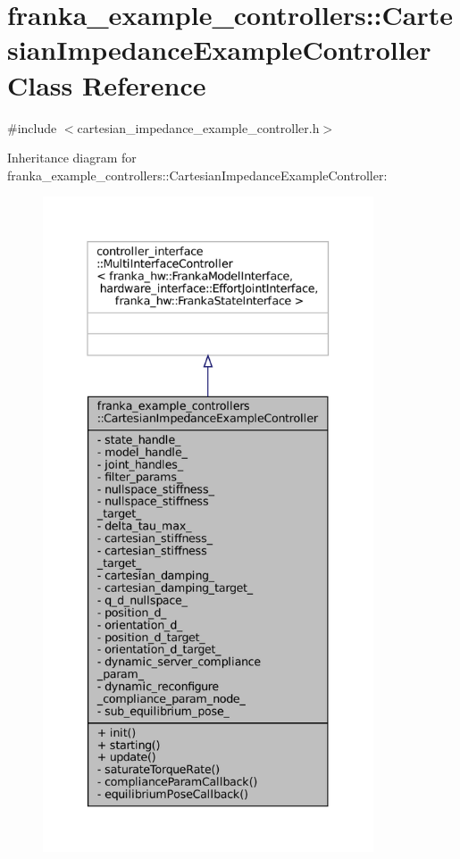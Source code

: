 \hypertarget{classfranka__example__controllers_1_1CartesianImpedanceExampleController}{}\section{franka\+\_\+example\+\_\+controllers\+:\+:Cartesian\+Impedance\+Example\+Controller Class Reference}
\label{classfranka__example__controllers_1_1CartesianImpedanceExampleController}


{\ttfamily \#include $<$cartesian\+\_\+impedance\+\_\+example\+\_\+controller.\+h$>$}



Inheritance diagram for franka\+\_\+example\+\_\+controllers\+:\+:Cartesian\+Impedance\+Example\+Controller\+:
\nopagebreak
\begin{figure}[H]
\begin{center}
\leavevmode
\includegraphics[height=550pt]{classfranka__example__controllers_1_1CartesianImpedanceExampleController__inherit__graph}
\end{center}
\end{figure}


